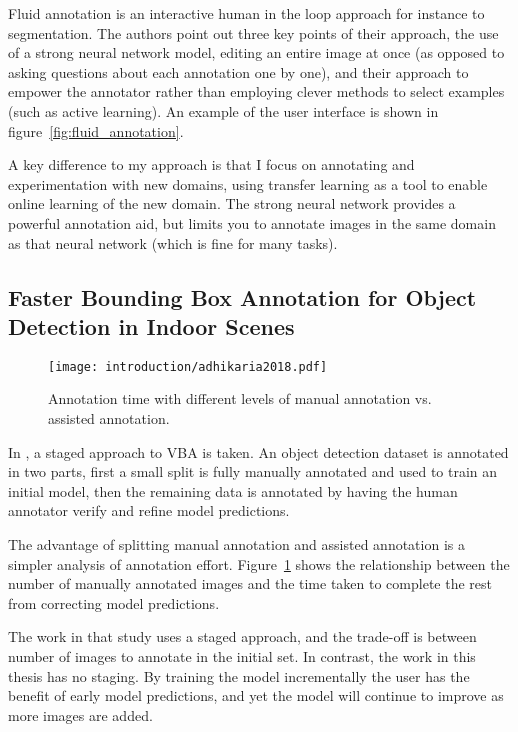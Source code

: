 Fluid annotation is an interactive human in the loop approach for instance to segmentation. The authors point out three key points of their approach, the use of a strong neural network model, editing an entire image at once (as opposed to asking questions about each annotation one by one), and their approach to empower the annotator rather than employing clever methods to select examples (such as active learning). An example of the user interface is shown in figure~\ref{fig:fluid_annotation}.

A key difference to my approach is that I focus on annotating and experimentation with new domains, using transfer learning as a tool to enable online learning of the new domain. The strong neural network provides a powerful annotation aid, but limits you to annotate images in the same domain as that neural network (which is fine for many tasks).

\subsection{Faster Bounding Box Annotation for Object Detection in Indoor Scenes}

\begin{figure}[h]
  \centering
  \texttt{[image: introduction/adhikaria2018.pdf]}
  \caption{Annotation time with different levels of manual annotation vs. assisted annotation. \cite{Adhikaria2018}}  
  \label{fig:adhikaria2018}
\end{figure}

In \cite{Adhikaria2018}, a staged approach to \gls{VBA} is taken. An object detection dataset is annotated in two parts, first a small split is fully manually annotated and used to train an initial model, then the remaining data is annotated by having the human annotator verify and refine model predictions. 


The advantage of splitting manual annotation and assisted annotation is a simpler analysis of annotation effort. Figure~\ref{fig:adhikaria2018} shows the relationship between the number of manually annotated images and the time taken to complete the rest from correcting model predictions.

The work in that study uses a staged approach, and the trade-off is between number of images to annotate in the initial set. In contrast, the work in this thesis has no staging. By training the model incrementally the user has the benefit of early model predictions, and yet the model will continue to improve as more images are added.

